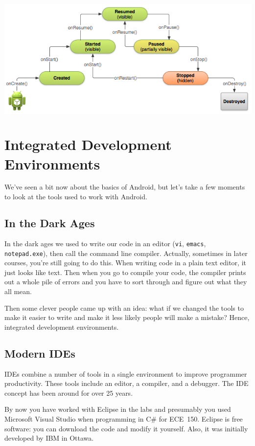 \begin{center}
\includegraphics[width=.9\textwidth]{images/basic-lifecycle}\cite{android:lifecycle}
\end{center}


\section*{Integrated Development Environments}

We've seen a bit now about the basics of Android, but let's take a few moments to look at the tools used to work with Android.

\subsection*{In the Dark Ages}
In the dark ages we used to write our code in an editor (\texttt{vi}, \texttt{emacs}, \texttt{notepad.exe}), then call the command line compiler. Actually, sometimes in later courses, you're still going to do this. When writing code in a plain text editor, it just looks like text. Then when you go to compile your code, the compiler prints out a whole pile of errors and you have to sort through and figure out what they all mean.

Then some clever people came up with an idea: what if we changed the tools to make it easier to write and make it less likely people will make a mistake? Hence, integrated development environments. 


\subsection*{Modern IDEs}
IDEs combine a number of tools in a single environment to improve
programmer productivity. These tools include an editor, a compiler,
and a debugger. The IDE concept has been around for over 25 years.

By now you have worked with Eclipse in the labs and presumably you used Microsoft Visual Studio when programming in C\# for ECE~150. Eclipse is free software: you can download the code and modify it yourself. Also, it was initially developed by IBM in Ottawa.

